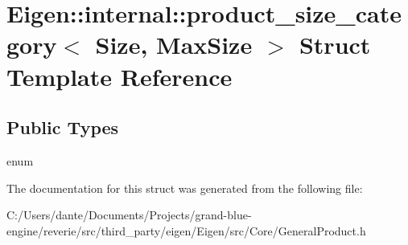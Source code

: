 \hypertarget{struct_eigen_1_1internal_1_1product__size__category}{}\section{Eigen\+::internal\+::product\+\_\+size\+\_\+category$<$ Size, Max\+Size $>$ Struct Template Reference}
\label{struct_eigen_1_1internal_1_1product__size__category}
\subsection*{Public Types}
\begin{DoxyCompactItemize}
\item 
\mbox{\label{struct_eigen_1_1internal_1_1product__size__category_a9617657628ce1d1d20029f660b8413f2}} 
enum 
\end{DoxyCompactItemize}


The documentation for this struct was generated from the following file\+:\begin{DoxyCompactItemize}
\item 
C\+:/\+Users/dante/\+Documents/\+Projects/grand-\/blue-\/engine/reverie/src/third\+\_\+party/eigen/\+Eigen/src/\+Core/General\+Product.\+h\end{DoxyCompactItemize}
